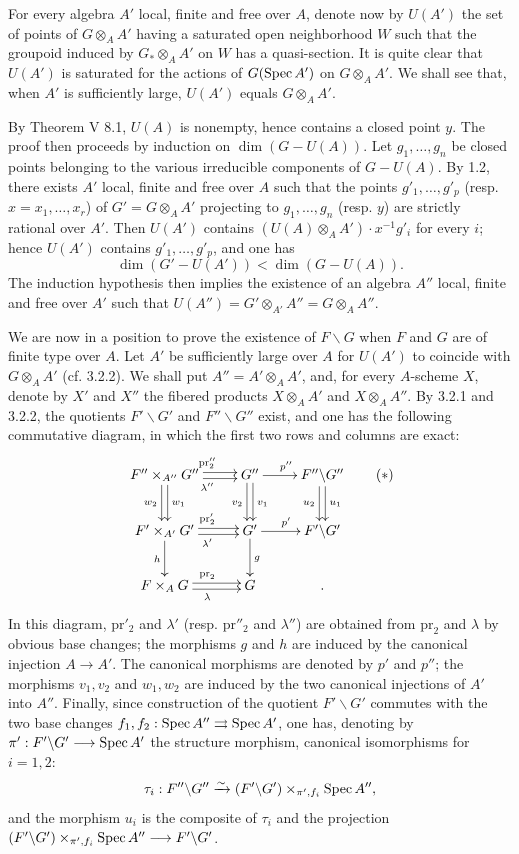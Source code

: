 For every algebra $A'$ local, finite and free over $A$, denote now by $U(A')$ the set of points of $G\otimes_AA'$ having a saturated open neighborhood $W$ such that the groupoid induced by $G_*\otimes_AA'$ on $W$ has a quasi-section. It is quite clear that $U(A')$ is saturated for the actions of $G(\operatorname{Spec} A')$ on $G\otimes_AA'$. We shall see that, when $A'$ is sufficiently large, $U(A')$ equals $G\otimes_AA'$.

By Theorem V 8.1, $U(A)$ is nonempty, hence contains a closed point $y$. The proof then proceeds by induction on $\dim(G-U(A))$. Let $g_1,\ldots,g_n$ be closed points belonging to the various irreducible components of $G-U(A)$. By 1.2, there exists $A'$ local, finite and free over $A$ such that the points $g'_1,\ldots,g'_p$ (resp. $x=x_1,\ldots,x_r$) of $G'=G\otimes_AA'$ projecting to $g_1,\ldots,g_n$ (resp. $y$) are strictly rational over $A'$. Then $U(A')$ contains $(U(A)\otimes_AA')\cdot x^{-1}g'_i$ for every $i$; hence $U(A')$ contains $g'_1,\ldots,g'_p$, and one has
\[
\dim(G'-U(A'))<\dim(G-U(A)).
\]
The induction hypothesis then implies the existence of an algebra $A''$ local, finite and free over $A'$ such that $U(A'')=G'\otimes_{A'}A''=G\otimes_AA''$.

We are now in a position to prove the existence of $F\backslash G$ when $F$ and $G$ are of finite type over $A$. Let $A'$ be sufficiently large over $A$ for $U(A')$ to coincide with $G\otimes_AA'$ (cf. 3.2.2). We shall put $A''=A'\otimes_AA'$, and, for every $A$-scheme $X$, denote by $X'$ and $X''$ the fibered products $X\otimes_AA'$ and $X\otimes_AA''$. By 3.2.1 and 3.2.2, the quotients $F'\backslash G'$ and $F''\backslash G''$ exist, and one has the following commutative diagram, in which the first two rows and columns are exact:
\[
\xymatrix{F''\times_{A''}G''\ar@<.5ex>[r]^{\mathrm{pr}''_2}\ar@<-.5ex>[r]_{\lambda''}\ar@<.5ex>[d]^{w_1}\ar@<-.5ex>[d]_{w_2}&G''\ar[r]^{p''}\ar@<.5ex>[d]^{v_1}\ar@<-.5ex>[d]_{v_2}&F''\backslash G''\ar@<.5ex>[d]^{u_1}\ar@<-.5ex>[d]_{u_2}\\F'\times_{A'}G'\ar@<.5ex>[r]^{\mathrm{pr}'_2}\ar@<-.5ex>[r]_{\lambda'}\ar[d]_h&G'\ar[r]^{p'}\ar[d]^g&F'\backslash G'\\F\times_AG\ar@<.5ex>[r]^{\mathrm{pr}_2}\ar@<-.5ex>[r]_\lambda&G&.}\tag{$*$}
\]
In this diagram, $\mathrm{pr}'_2$ and $\lambda'$ (resp. $\mathrm{pr}''_2$ and $\lambda''$) are obtained from $\mathrm{pr}_2$ and $\lambda$ by obvious base changes; the morphisms $g$ and $h$ are induced by the canonical injection $A\to A'$. The canonical morphisms are denoted by $p'$ and $p''$; the morphisms $v_1,v_2$ and $w_1,w_2$ are induced by the two canonical injections of $A'$ into $A''$. Finally, since construction of the quotient $F'\backslash G'$ commutes with the two base changes $f_1,f_2:\operatorname{Spec} A''\rightrightarrows\operatorname{Spec} A'$, one has, denoting by $\pi':F'\backslash G'\longrightarrow\operatorname{Spec} A'$ the structure morphism, canonical isomorphisms for $i=1,2$:
\[
\tau_i:F''\backslash G''\xrightarrow{\sim}(F'\backslash G')\times_{\pi',f_i}\operatorname{Spec} A'',
\]
and the morphism $u_i$ is the composite of $\tau_i$ and the projection $(F'\backslash G')\times_{\pi',f_i}\operatorname{Spec} A''\longrightarrow F'\backslash G'$.

